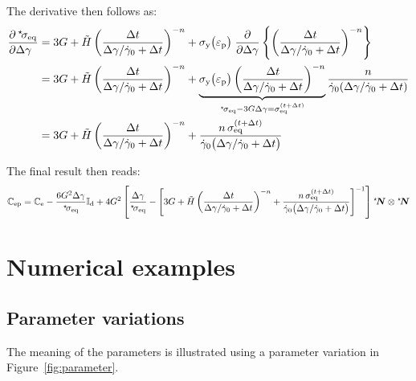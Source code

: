 \documentclass[times,namecite]{goose-article}
\newcommand\leftstar[1]{\hspace*{-.3em}~^\star\!#1}
\begin{document}
\begin{itemize}
The derivative then follows as:
\begin{align}
  \frac{
    \partial \,\leftstar{\sigma}_\mathrm{eq} \hfill
  }{
    \partial \Delta \gamma \hfill
  }
  &=
  3 G
  +
  \tilde{H} \left( \frac{\Delta t}{ \Delta \gamma / \dot{\gamma}_0 + \Delta t} \right)^{-n}
  + \sigma_\mathrm{y} \big( \varepsilon_\mathrm{p} \big) \;
  \frac{\partial}{\partial \Delta \gamma}
  \left\{
    \left( \frac{\Delta t}{ \Delta \gamma / \dot{\gamma}_0 + \Delta t} \right)^{-n}
  \right\}
  \\
  &=
  3 G
  +
  \tilde{H} \left( \frac{\Delta t}{ \Delta \gamma / \dot{\gamma}_0 + \Delta t} \right)^{-n}
  +
  \underbrace{
    \sigma_\mathrm{y} \big( \varepsilon_\mathrm{p} \big)
    \left( \frac{\Delta t}{ \Delta \gamma / \dot{\gamma}_0 + \Delta t} \right)^{-n}
  }_{\leftstar{\sigma}_\mathrm{eq} - 3 G \Delta \gamma = \sigma_\mathrm{eq}^{(t+\Delta t)}}
  \frac{n }{\dot{\gamma}_0 ( \Delta \gamma / \dot{\gamma}_0 + \Delta t)}
  \\
  &=
  3 G
  +
  \tilde{H} \left( \frac{\Delta t}{ \Delta \gamma / \dot{\gamma}_0 + \Delta t} \right)^{-n}
  +
  \frac{n \, \sigma_\mathrm{eq}^{(t+\Delta t)}}{\dot{\gamma}_0 \big(  \Delta \gamma / \dot{\gamma}_0 + \Delta t \big)}
\end{align}
%
\end{itemize}
%
The final result then reads:
\begin{equation}
\mathbb{C}_\mathrm{ep}
=
\mathbb{C}_\mathrm{e} -
\frac{6 G^2 \Delta \gamma}{\leftstar{\sigma}_\mathrm{eq}} \mathbb{I}_\mathrm{d}
+ 4 G^2
\left[
  \frac{\Delta \gamma}{\leftstar{\sigma}_\mathrm{eq}} -
  \left[
    3 G
    +
    \tilde{H} \left( \frac{\Delta t}{ \Delta \gamma / \dot{\gamma}_0 + \Delta t} \right)^{-n}
    +
    \frac{n \, \sigma_\mathrm{eq}^{(t+\Delta t)}}{\dot{\gamma}_0 \big(  \Delta \gamma / \dot{\gamma}_0 + \Delta t \big)}
  \right]^{-1}
\right]
\leftstar{\bm{N}} \otimes \leftstar{\bm{N}}
\end{equation}

\vfill\newpage
\section{Numerical examples}

\subsection{Parameter variations}

The meaning of the parameters is illustrated using a parameter variation in Figure~\ref{fig:parameter}.
\end{document}
